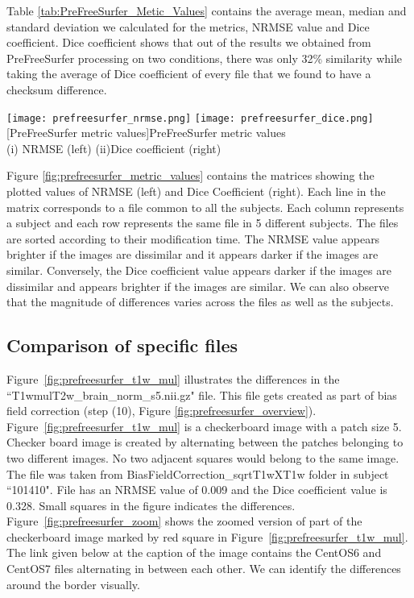 Table \ref{tab:PreFreeSurfer_Metic_Values} contains the average mean, median and standard deviation we calculated for the metrics, NRMSE value and Dice coefficient. Dice coefficient shows that out of the results we obtained from PreFreeSurfer processing on two conditions, there was only 32\% similarity while taking the average of Dice coefficient of every file that we found to have a checksum difference.

\begin{center}
\texttt{[image: prefreesurfer\_nrmse.png]}%
\texttt{[image: prefreesurfer\_dice.png]}
[PreFreeSurfer metric values]{PreFreeSurfer metric values\\(i) NRMSE (left) (ii)Dice coefficient (right)}
\label{fig:prefreesurfer_metric_values}
\end{center}

Figure \ref{fig:prefreesurfer_metric_values} contains the matrices showing the plotted values of NRMSE (left) and Dice Coefficient (right).
Each line in the matrix corresponds to a file common to all the subjects.
Each column represents a subject and each row represents the same file in 5 different subjects. The files are sorted according to their modification time.
The NRMSE value appears brighter if the images are dissimilar and it appears darker if the images are similar. Conversely, the Dice coefficient value appears darker if the images are dissimilar and appears brighter if the images are similar. We can also observe that the magnitude of differences varies across the files as well as the subjects.

\subsection{Comparison of specific files}
Figure~\ref{fig:prefreesurfer_t1w_mul} illustrates the differences in the ``T1wmulT2w\_brain\_norm\_s5.nii.gz" file. This file gets created as part of bias field correction (step (10), Figure \ref{fig:prefreesurfer_overview}). Figure~\ref{fig:prefreesurfer_t1w_mul} is a checkerboard image with a patch size 5. Checker board image is created by alternating between the patches belonging to two different images. No two adjacent squares would belong to the same image. 
The file was taken from BiasFieldCorrection\_sqrtT1wXT1w folder in subject ``101410". File has an NRMSE value of 0.009 and the Dice coefficient value is 0.328. Small squares in the figure indicates the differences. Figure~\ref{fig:prefreesurfer_zoom} shows the zoomed version of part of the checkerboard image marked by red square in Figure~\ref{fig:prefreesurfer_t1w_mul}.
The link given below at the caption of the image contains the CentOS6 and CentOS7 files alternating in between each other. We can identify the differences around the border visually.

